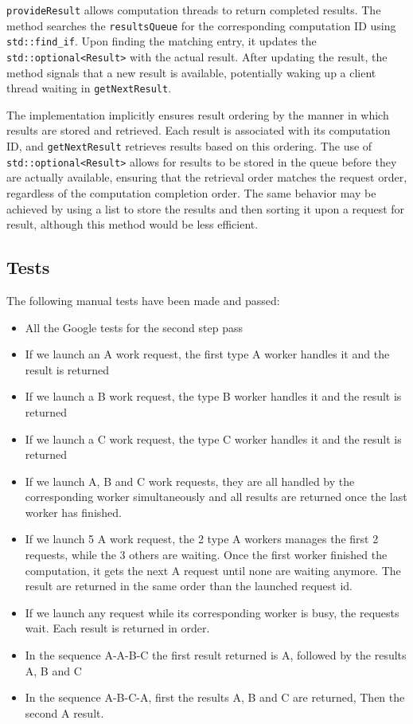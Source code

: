 \documentclass{article}
\begin{document}
    \texttt{provideResult} allows computation threads to return completed results.
    The method searches the \texttt{resultsQueue} for the corresponding computation ID using \texttt{std::find\_if}.
    Upon finding the matching entry, it updates the \texttt{std::optional<Result>} with the actual result.
    After updating the result, the method signals that a new result is available, potentially waking up a client thread waiting in \texttt{getNextResult}.

    The implementation implicitly ensures result ordering by the manner in which results are stored and retrieved.
    Each result is associated with its computation ID, and \texttt{getNextResult} retrieves results based on this ordering.
    The use of \texttt{std::optional<Result>} allows for results to be stored in the queue before they are actually available, ensuring that the retrieval order matches the request order, regardless of the computation completion order.
    The same behavior may be achieved by using a list to store the results and then sorting it upon a request for result, although this method would be less efficient.

    \subsection*{Tests}

    The following manual tests have been made and passed:
    \begin{itemize}
        \item All the Google tests for the second step pass
        \item If we launch an A work request, the first type A worker handles it and the result is returned
        \item If we launch a B work request, the type B worker handles it and the result is returned
        \item If we launch a C work request, the type C worker handles it and the result is returned
        \item If we launch A, B and C work requests, they are all handled by the corresponding worker simultaneously and all results are returned once the last worker has finished.
        \item If we launch 5 A work request, the 2 type A workers manages the first 2 requests, while the 3 others are waiting. Once the first worker finished the computation, it gets the next A request until none are waiting anymore. The result are returned in the same order than the launched request id.
        \item If we launch any request while its corresponding worker is busy, the requests wait. Each result is returned in order.
        \item In the sequence A-A-B-C the first result returned is A, followed by the results A, B and C
        \item In the sequence A-B-C-A, first the results A, B and C are returned, Then the second A result.
    \end{itemize}
\end{document}
